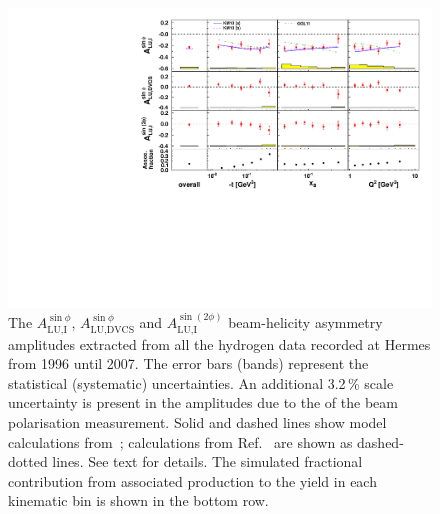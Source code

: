 \begin{figure}
 \begin{center}
 \includegraphics[width=15cm]{bsadvcsplots_eml_par13_bin6_release_all_pic_cluster_dual_update_1.pdf}
  \caption{The $A_{\textrm{LU,I}}^{\sin\phi}$, $A_{\textrm{LU,DVCS}}^{\sin\phi}$ and
$A_{\textrm{LU,I}}^{\sin(2\phi)}$ beam-helicity asymmetry amplitudes extracted from all the hydrogen data recorded at H{\sc ermes}
from 1996 until 2007. The error bars (bands) represent the statistical
(systematic) uncertainties. An additional 3.2\,\% scale uncertainty is present in the amplitudes due to the  of
the beam polarisation measurement. Solid and dashed lines show model calculations from~\cite{Kum09}; calculations from Ref.~\cite{Liu11} are shown as dashed-dotted lines. See text for details. The simulated fractional contribution from associated production to the yield in each kinematic bin is shown in the bottom row.}
  \label{bsa_xbjrange}
 \end{center}
\end{figure}

